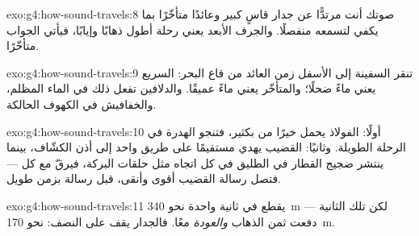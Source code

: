 \begin{solution}{exo:g4:how-sound-travels:8}
 صوتك أنت مرتدًّا عن جدار قاسٍ كبير وعائدًا متأخّرًا بما
يكفي لتسمعه منفصلًا. والجرف الأبعد يعني رحلة أطول  ذهابًا
وإيابًا، فيأتي الجواب متأخّرًا.
\end{solution}

\begin{solution}{exo:g4:how-sound-travels:9}
تنقر السفينة إلى الأسفل  زمن  العائد من قاع البحر:
 السريع يعني ماءً ضحلًا؛ والمتأخّر يعني ماءً عميقًا.
والدلافين تفعل ذلك في الماء المظلم، والخفافيش في الكهوف
الحالكة.
\end{solution}

\begin{solution}{exo:g4:how-sound-travels:10}
أولًا: الفولاذ يحمل  خيرًا من  بكثير، فتنجو الهدرة
في الرحلة الطويلة. وثانيًا: القضيب يهدي  مستقيمًا على طريق
واحد إلى أذن الكشّاف، بينما ينتشر ضجيج القطار في  الطليق
في كل اتجاه مثل حلقات البركة، فيرقّ مع كل  --- فتصل رسالة
القضيب أقوى وأنقى، قبل رسالة  بزمن طويل.
\end{solution}

\begin{solution}{exo:g4:how-sound-travels:11}
يقطع  في ثانية واحدة نحو \qty{340}{m} --- لكن تلك الثانية
دفعت ثمن الذهاب \emph{والعودة} معًا. فالجدار يقف على النصف:
نحو \qty{170}{m}.
\end{solution}
